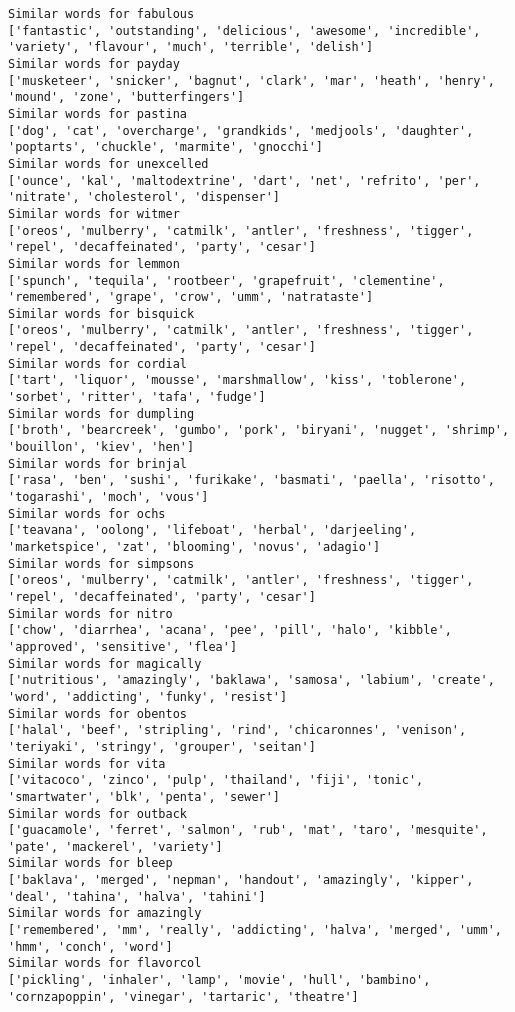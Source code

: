 \documentclass[11pt]{article}
\begin{document}
\begin{Verbatim}[commandchars=\\\{\}]
Similar words for fabulous
['fantastic', 'outstanding', 'delicious', 'awesome', 'incredible', 'variety', 'flavour', 'much', 'terrible', 'delish']
Similar words for payday
['musketeer', 'snicker', 'bagnut', 'clark', 'mar', 'heath', 'henry', 'mound', 'zone', 'butterfingers']
Similar words for pastina
['dog', 'cat', 'overcharge', 'grandkids', 'medjools', 'daughter', 'poptarts', 'chuckle', 'marmite', 'gnocchi']
Similar words for unexcelled
['ounce', 'kal', 'maltodextrine', 'dart', 'net', 'refrito', 'per', 'nitrate', 'cholesterol', 'dispenser']
Similar words for witmer
['oreos', 'mulberry', 'catmilk', 'antler', 'freshness', 'tigger', 'repel', 'decaffeinated', 'party', 'cesar']
Similar words for lemmon
['spunch', 'tequila', 'rootbeer', 'grapefruit', 'clementine', 'remembered', 'grape', 'crow', 'umm', 'natrataste']
Similar words for bisquick
['oreos', 'mulberry', 'catmilk', 'antler', 'freshness', 'tigger', 'repel', 'decaffeinated', 'party', 'cesar']
Similar words for cordial
['tart', 'liquor', 'mousse', 'marshmallow', 'kiss', 'toblerone', 'sorbet', 'ritter', 'tafa', 'fudge']
Similar words for dumpling
['broth', 'bearcreek', 'gumbo', 'pork', 'biryani', 'nugget', 'shrimp', 'bouillon', 'kiev', 'hen']
Similar words for brinjal
['rasa', 'ben', 'sushi', 'furikake', 'basmati', 'paella', 'risotto', 'togarashi', 'moch', 'vous']
Similar words for ochs
['teavana', 'oolong', 'lifeboat', 'herbal', 'darjeeling', 'marketspice', 'zat', 'blooming', 'novus', 'adagio']
Similar words for simpsons
['oreos', 'mulberry', 'catmilk', 'antler', 'freshness', 'tigger', 'repel', 'decaffeinated', 'party', 'cesar']
Similar words for nitro
['chow', 'diarrhea', 'acana', 'pee', 'pill', 'halo', 'kibble', 'approved', 'sensitive', 'flea']
Similar words for magically
['nutritious', 'amazingly', 'baklawa', 'samosa', 'labium', 'create', 'word', 'addicting', 'funky', 'resist']
Similar words for obentos
['halal', 'beef', 'stripling', 'rind', 'chicaronnes', 'venison', 'teriyaki', 'stringy', 'grouper', 'seitan']
Similar words for vita
['vitacoco', 'zinco', 'pulp', 'thailand', 'fiji', 'tonic', 'smartwater', 'blk', 'penta', 'sewer']
Similar words for outback
['guacamole', 'ferret', 'salmon', 'rub', 'mat', 'taro', 'mesquite', 'pate', 'mackerel', 'variety']
Similar words for bleep
['baklava', 'merged', 'nepman', 'handout', 'amazingly', 'kipper', 'deal', 'tahina', 'halva', 'tahini']
Similar words for amazingly
['remembered', 'mm', 'really', 'addicting', 'halva', 'merged', 'umm', 'hmm', 'conch', 'word']
Similar words for flavorcol
['pickling', 'inhaler', 'lamp', 'movie', 'hull', 'bambino', 'cornzapoppin', 'vinegar', 'tartaric', 'theatre']

\end{Verbatim}
\end{document}
